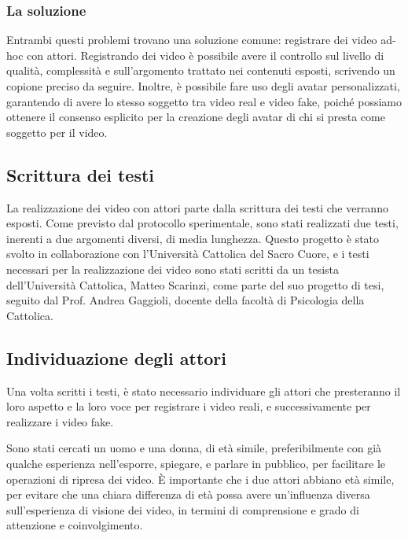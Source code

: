 \subsubsection{La soluzione}

Entrambi questi problemi trovano una soluzione comune: registrare dei video ad-hoc con attori. Registrando dei video è possibile avere il controllo sul livello di qualità, complessità e sull'argomento trattato nei contenuti esposti, scrivendo un copione preciso da seguire. Inoltre, è possibile fare uso degli avatar personalizzati, garantendo di avere lo stesso soggetto tra video real e video fake, poiché possiamo ottenere il consenso esplicito per la creazione degli avatar di chi si presta come soggetto per il video.

\subsection{Scrittura dei testi}

La realizzazione dei video con attori parte dalla scrittura dei testi che verranno esposti. Come previsto dal protocollo sperimentale, sono stati realizzati due testi, inerenti a due argomenti diversi, di media lunghezza. Questo progetto è stato svolto in collaborazione con l'Università Cattolica del Sacro Cuore, e i testi necessari per la realizzazione dei video sono stati scritti da un tesista dell'Università Cattolica, Matteo Scarinzi, come parte del suo progetto di tesi, seguito dal Prof. Andrea Gaggioli, docente della facoltà di Psicologia della Cattolica.

\subsection{Individuazione degli attori}

Una volta scritti i testi, è stato necessario individuare gli attori che presteranno il loro aspetto e la loro voce per registrare i video reali, e successivamente per realizzare i video fake.

Sono stati cercati un uomo e una donna, di età simile, preferibilmente con già qualche esperienza nell'esporre, spiegare, e parlare in pubblico, per facilitare le operazioni di ripresa dei video. È importante che i due attori abbiano età simile, per evitare che una chiara differenza di età possa avere un'influenza diversa sull'esperienza di visione dei video, in termini di comprensione e grado di attenzione e coinvolgimento.

